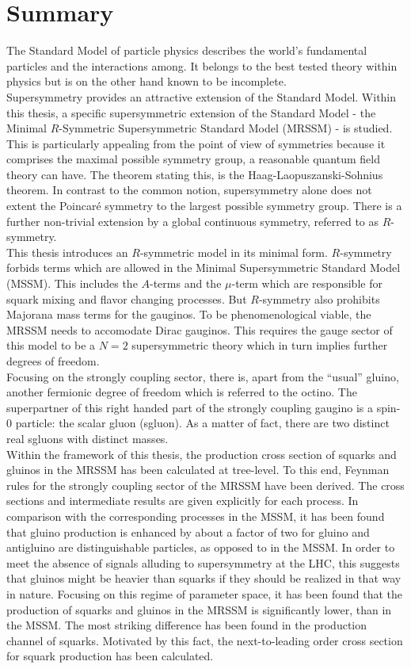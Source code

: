 \section{Summary}

The Standard Model of particle physics describes the world's fundamental particles and the interactions among. It belongs to the best tested theory within physics but is on the other hand known to be incomplete.\\
Supersymmetry provides an attractive extension of the Standard Model. Within this thesis, a specific supersymmetric extension of the Standard Model - the Minimal $R$-Symmetric Supersymmetric Standard Model (MRSSM) - is studied. This is particularly appealing from the point of view of symmetries because it comprises the maximal possible symmetry group, a reasonable quantum field theory can have. The theorem stating this, is the Haag-Laopuszanski-Sohnius theorem. In contrast to the common notion, supersymmetry alone does not extent the Poincaré symmetry to the largest possible symmetry group. There is a further non-trivial extension by a global continuous symmetry, referred to as $R$-symmetry.\\
This thesis introduces an $R$-symmetric model in its minimal form. $R$-symmetry forbids terms which are allowed in the Minimal Supersymmetric Standard Model (MSSM). This includes the $A$-terms and the $\mu$-term which are responsible for squark mixing and flavor changing processes. But $R$-symmetry also prohibits Majorana mass terms for the gauginos. To be phenomenological viable, the MRSSM needs to accomodate Dirac gauginos. This requires the gauge sector of this model to be a $N=2$ supersymmetric theory which in turn implies further degrees of freedom.\\
Focusing on the strongly coupling sector, there is, apart from the ``usual'' gluino, another fermionic degree of freedom which is referred to the octino. The superpartner of this right handed part of the strongly coupling gaugino is a spin-0 particle: the scalar gluon (sgluon). As a matter of fact, there are two distinct real sgluons with distinct masses.\\ 
Within the framework of this thesis, the production cross section of squarks and gluinos in the MRSSM has been calculated at tree-level. To this end, Feynman rules for the strongly coupling sector of the MRSSM have been derived. The cross sections and intermediate results are given explicitly for each process. In comparison with the corresponding processes in the MSSM, it has been found that gluino production is enhanced by about a factor of two for gluino and antigluino are distinguishable particles, as opposed to in the MSSM. In order to meet the absence of signals alluding to supersymmetry at the LHC, this suggests that gluinos might be heavier than squarks if they should be realized in that way in nature. Focusing on this regime of parameter space, it has been found that the production of squarks and gluinos in the MRSSM is significantly lower, than in the MSSM. The most striking difference has been found in the production channel of squarks. Motivated by this fact, the next-to-leading order cross section for squark production has been calculated.\\
